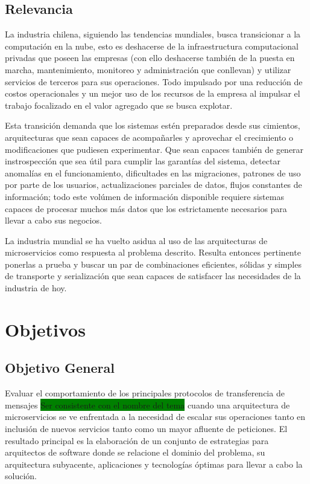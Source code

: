 
\subsection{Relevancia} %
\label{sub:relevancia}

La industria chilena, siguiendo las tendencias mundiales, busca transicionar a la computación en la nube, esto es deshacerse de la infraestructura computacional privadas que poseen las empresas (con ello deshacerse también de la puesta en marcha, mantenimiento, monitoreo y administración que conllevan) y utilizar servicios de terceros para sus operaciones. Todo impulsado por una reducción de costos operacionales y un mejor uso de los recursos de la empresa al impulsar el trabajo focalizado en el valor agregado que se busca explotar.

Esta transición demanda que los sistemas estén preparados desde sus cimientos, arquitecturas que sean capaces de acompañarles y aprovechar el crecimiento o modificaciones que pudiesen experimentar. Que sean capaces también de generar instrospección que sea útil para cumplir las garantías del sistema, detectar anomalías en el funcionamiento, dificultades en las migraciones, patrones de uso por parte de los usuarios, actualizaciones parciales de datos, flujos constantes de información; todo este volúmen de información disponible requiere sistemas capaces de procesar muchos más datos que los estrictamente necesarios para llevar a cabo sus negocios.

La industria mundial se ha vuelto asidua al uso de las arquitecturas de microservicios como respuesta al problema descrito. Resulta entonces pertinente ponerlas a prueba y buscar un par de combinaciones eficientes, sólidas y simples de transporte y serialización que sean capaces de satisfacer las necesidades de la industria de hoy.

\section{Objetivos}

\subsection{Objetivo General}
Evaluar el comportamiento de los principales protocolos de transferencia de mensajes \colorbox{green}{Ser consistente con el nombre del tema} cuando una arquitectura de microservicios se ve enfrentada a la necesidad de escalar sus operaciones tanto en inclusión de nuevos servicios tanto como un mayor afluente de peticiones.
El resultado principal es la elaboración de un conjunto de estrategias para arquitectos de software donde se relacione el dominio del problema, su arquitectura subyacente, aplicaciones y tecnologías óptimas para llevar a cabo la solución.


